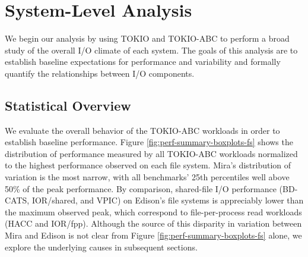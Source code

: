 \section{System-Level Analysis} \label{sec:results}

We begin our analysis by using TOKIO and TOKIO-ABC to perform a broad study of the overall I/O climate of each system.
The goals of this analysis are to
establish baseline expectations for performance and variability and
formally quantify the relationships between I/O components.
%

\subsection{Statistical Overview} \label{sec:results/overview}

We evaluate the overall behavior of the TOKIO-ABC workloads in order to
establish baseline performance.
Figure \ref{fig:perf-summary-boxplots-fs} shows the distribution of performance measured by all TOKIO-ABC workloads normalized to the highest performance observed on each file system.
Mira's distribution of variation is the most narrow, with all benchmarks' 25th percentiles well above 50\% of the peak performance.
By comparison, shared-file I/O performance (BD-CATS, IOR/shared, and VPIC) on Edison's file systems is appreciably lower than the maximum observed peak, which correspond to file-per-process read workloads (HACC and IOR/fpp).
Although the source of this disparity in variation between Mira and Edison is not clear from Figure \ref{fig:perf-summary-boxplots-fs} alone, we explore the underlying causes in subsequent sections.

